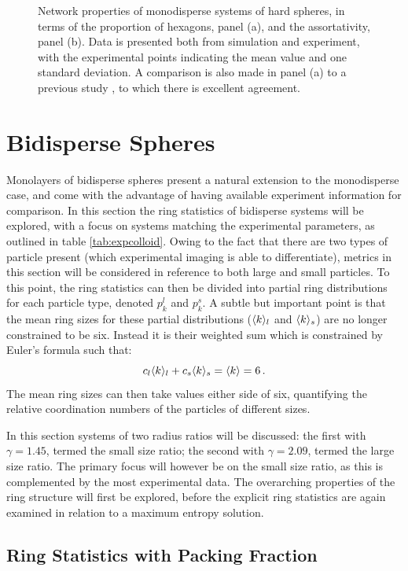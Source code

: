 \begin{figure}[bt]
     \caption{Network properties of monodisperse systems of \qtd{} hard spheres, in terms of the proportion of hexagons, panel (a), and the assortativity, panel (b). Data is presented both from simulation and experiment, with the experimental points indicating the mean value and one standard deviation. A comparison is also made in panel (a) to a previous study \cite{Kumar2005}, to which there is excellent agreement.}
     \label{fig:mono}
\end{figure}


\section{Bidisperse Spheres}

Monolayers of bidisperse spheres present a natural extension to the monodisperse case, and come with the advantage of having available experiment information for comparison.
In this section the ring statistics of bidisperse systems will be explored, with a focus on systems matching the experimental parameters, as outlined in table \ref{tab:expcolloid}.
Owing to the fact that there are two types of particle present (which experimental imaging is able to differentiate), metrics in this section will be considered in reference to both large and small particles.
To this point, the ring statistics can then be divided into partial ring distributions for each particle type, denoted $p_k^l$ and $p_k^s$.
A subtle but important point is that the mean ring sizes for these partial distributions ($\langle k \rangle_l$ and $\langle k \rangle_s$) are no longer constrained to be six.
Instead it is their weighted sum which is constrained by Euler's formula such that:
\begin{equation}
	c_l\langle k \rangle_l+c_s\langle k \rangle_s = \langle k \rangle = 6\,.
\end{equation}
The mean ring sizes can then take values either side of six, quantifying the relative coordination numbers of the particles of different sizes.

In this section systems of two radius ratios will be discussed: the first with $\gamma=1.45$, termed the small size ratio; the second with $\gamma=2.09$, termed the large size ratio.
The primary focus will however be on the small size ratio, as this is complemented by the most experimental data.
The overarching properties of the ring structure will first be explored, before the explicit ring statistics are again examined in relation to a maximum entropy solution.


\subsection{Ring Statistics with Packing Fraction}

